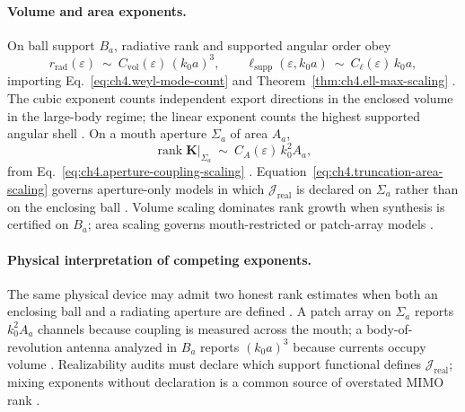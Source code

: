 \paragraph{Volume and area exponents.}
On ball support \(B_{a}\), radiative rank and supported angular order obey
\begin{equation}
\label{eq:ch4.truncation-volume-scaling}
r_{\mathrm{rad}}(\varepsilon)
\ \sim\
C_{\mathrm{vol}}(\varepsilon)\,(k_{0}a)^{3},
\qquad
\ell_{\mathrm{supp}}(\varepsilon,k_{0}a)
\ \sim\
C_{\ell}(\varepsilon)\,k_{0}a,
\end{equation}
importing Eq.~\eqref{eq:ch4.weyl-mode-count} and Theorem~\ref{thm:ch4.ell-max-scaling} \cite{stratton1941,jackson1999,hansen1988}.
The cubic exponent counts independent export directions in the enclosed volume in the large-body regime; the linear exponent counts the
highest supported angular shell \cite{harrington2001,devaney2004}. On a mouth aperture \(\Sigma_{a}\) of area \(A_{a}\),
\begin{equation}
\label{eq:ch4.truncation-area-scaling}
\operatorname{rank}\mathbf{K}\big|_{\Sigma_{a}}
\ \sim\
C_{A}(\varepsilon)\,k_{0}^{2}A_{a},
\end{equation}
from Eq.~\eqref{eq:ch4.aperture-coupling-scaling} \cite{collin2001,harrington2001,devaney2004}. Equation~\eqref{eq:ch4.truncation-area-scaling}
governs aperture-only models in which \(\mathcal{J}_{\mathrm{real}}\) is declared on \(\Sigma_{a}\) rather than on the enclosing ball
\cite{stratton1941,collin2001}. Volume scaling dominates rank growth when synthesis is certified on \(B_{a}\); area scaling governs
mouth-restricted or patch-array models \cite{hansen1988,jackson1999}.

\paragraph{Physical interpretation of competing exponents.}
The same physical device may admit two honest rank estimates when both an enclosing ball and a radiating aperture are defined
\cite{stratton1941,collin2001}. A patch array on \(\Sigma_{a}\) reports \(k_{0}^{2}A_{a}\) channels because coupling is measured
across the mouth; a body-of-revolution antenna analyzed in \(B_{a}\) reports \((k_{0}a)^{3}\) because currents occupy volume
\cite{harrington2001,devaney2004}. Realizability audits must declare which support functional defines \(\mathcal{J}_{\mathrm{real}}\);
mixing exponents without declaration is a common source of overstated MIMO rank \cite{hansen1988,jackson1999}.

